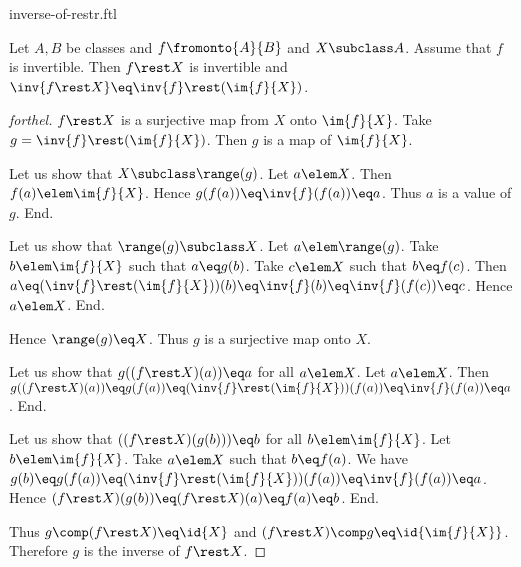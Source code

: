 \documentclass{naproche-library}
\begin{document}
\begin{smodule}[title=The Inverse of a Restriction]{inverse-of-restr.ftl}


\begin{proposition}[forthel,id=InvertibilityOfRestrProp]
  Let $A, B$ be classes and $f \fromonto{A}{B}$ and $X \subclass A$.
  Assume that $f$ is invertible.
  Then $f \rest X$ is invertible and $\inv{f\rest X} \eq \inv{f} \rest (\im{f}{X})$.
\end{proposition}
\begin{proof}[forthel]
  $f \rest X$ is a surjective map from $X$ onto $\im{f}{X}$.
  Take $g = \inv{f} \rest (\im{f}{X})$.
  Then $g$ is a map of $\im{f}{X}$.

  Let us show that $X \subclass \range(g)$.
    Let $a \elem X$.
    Then $f(a) \elem \im{f}{X}$.
    Hence $g(f(a)) \eq \inv{f}(f(a)) \eq a$.
    Thus $a$ is a value of $g$.
  End.

  Let us show that $\range(g) \subclass X$.
    Let $a \elem \range(g)$.
    Take $b \elem \im{f}{X}$ such that $a \eq g(b)$.
    Take $c \elem X$ such that $b \eq f(c)$.
    Then $a
      \eq (\inv{f} \rest (\im{f}{X}))(b)
      \eq \inv{f}(b)
      \eq \inv{f}(f(c))
      \eq c$.
    Hence $a \elem X$.
  End.

  Hence $\range(g) \eq X$.
  Thus $g$ is a surjective map onto $X$.

  Let us show that $g((f \rest X)(a)) \eq a$ for all $a \elem X$.
    Let $a \elem X$.
    Then $g((f \rest X)(a))
      \eq g(f(a))
      \eq (\inv{f} \rest (\im{f}{X}))(f(a))
      \eq \inv{f}(f(a))
      \eq a$.
  End.

  Let us show that $((f \rest X)(g(b))) \eq b$ for all $b \elem \im{f}{X}$.
    Let $b \elem \im{f}{X}$.
    Take $a \elem X$ such that $b \eq f(a)$.
    We have $g(b)
      \eq g(f(a))
      \eq (\inv{f} \rest (\im{f}{X}))(f(a))
      \eq \inv{f}(f(a))
      \eq a$.
    Hence $(f \rest X)(g(b))
      \eq (f \rest X)(a)
      \eq f(a)
      \eq b$.
  End.

  Thus $g \comp (f \rest X) \eq \id{X}$ and $(f \rest X) \comp g \eq \id{\im{f}{X}}$.
  Therefore $g$ is the inverse of $f \rest X$.
\end{proof}

\end{smodule}
\end{document}
